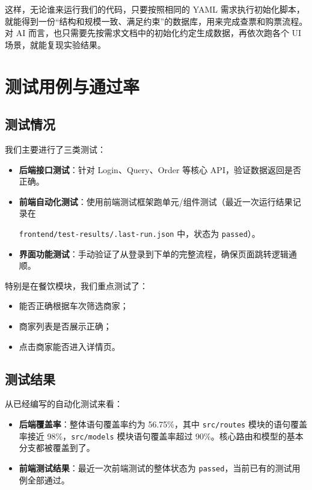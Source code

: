 \documentclass{article}
\begin{document}
这样，无论谁来运行我们的代码，只要按照相同的 YAML 需求执行初始化脚本，就能得到一份“结构和规模一致、满足约束”的数据库，用来完成查票和购票流程。对 AI 而言，也只需要先按需求文档中的初始化约定生成数据，再依次跑各个 UI 场景，就能复现实验结果。

\section{测试用例与通过率}

\subsection{测试情况}

我们主要进行了三类测试：
\begin{itemize}
    \item \textbf{后端接口测试}：针对 Login、Query、Order 等核心 API，验证数据返回是否正确。
    \item \textbf{前端自动化测试}：使用前端测试框架跑单元/组件测试（最近一次运行结果记录在 
    
    \texttt{frontend/test-results/.last-run.json} 中，状态为 \texttt{passed}）。
    \item \textbf{界面功能测试}：手动验证了从登录到下单的完整流程，确保页面跳转逻辑通顺。
\end{itemize}

特别是在餐饮模块，我们重点测试了：
\begin{itemize}
    \item 能否正确根据车次筛选商家；
    \item 商家列表是否展示正确；
    \item 点击商家能否进入详情页。
\end{itemize}

\subsection{测试结果}

从已经编写的自动化测试来看：
\begin{itemize}
    \item \textbf{后端覆盖率}：整体语句覆盖率约为 56.75\%，其中 \texttt{src/routes} 模块的语句覆盖率接近 98\%，\texttt{src/models} 模块语句覆盖率超过 90\%。核心路由和模型的基本分支都被覆盖到了。
    \item \textbf{前端测试结果}：最近一次前端测试的整体状态为 \texttt{passed}，当前已有的测试用例全部通过。
\end{itemize}
\end{document}

